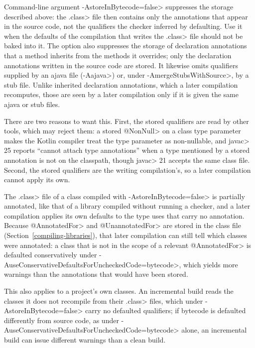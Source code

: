 
Command-line argument \<-AstoreInBytecode=false> suppresses the storage
described above:  the \<.class> file then contains only the annotations that appear in
the source code, not the qualifiers the checker inferred by defaulting.  Use
it when the defaults of the compilation that writes the \<.class> file should
not be baked into it.
The option also suppresses the storage of declaration annotations that a
method inherits from the methods it overrides; only the declaration annotations
written in the source code are stored.
It likewise omits qualifiers supplied by an ajava file (\<-Aajava>) or, under
\<-AmergeStubsWithSource>, by a stub file.  Unlike inherited declaration
annotations, which a later compilation recomputes, those are seen by a later
compilation only if it is given the same ajava or stub files.

There are two reasons to want this.  First, the stored qualifiers are read by
other tools, which may reject them:  a stored \<@NonNull> on a class type
parameter makes the Kotlin compiler treat the type parameter as non-nullable,
and \<javac> 25 reports ``cannot attach type annotations'' when a type
mentioned by a stored annotation is not on the classpath, though \<javac> 21
accepts the same class file.  Second, the stored qualifiers are the writing
compilation's, so a later compilation cannot apply its own.

The \<.class> file of a class compiled with \<-AstoreInBytecode=false> is
partially annotated, like that of a library compiled without running a
checker, and a later compilation applies its own defaults to the type uses
that carry no annotation.  Because \<@AnnotatedFor> and \<@UnannotatedFor>
are stored in the class file (Section~\ref{compiling-libraries}), that later
compilation can still tell which classes were annotated:  a class that is not
in the scope of a relevant \<@AnnotatedFor> is defaulted conservatively under
\<-AuseConservativeDefaultsForUncheckedCode=bytecode>, which yields more
warnings than the annotations that would have been stored.

This also applies to a project's own classes.  An incremental build reads
the classes it does not recompile from their \<.class> files, which under
\<-AstoreInBytecode=false> carry no defaulted qualifiers; if bytecode is
defaulted differently from source code, as under
\<-AuseConservativeDefaultsForUncheckedCode=bytecode> alone, an incremental
build can issue different warnings than a clean build.


